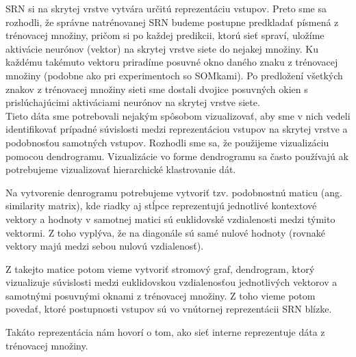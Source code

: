 SRN si na skrytej vrstve vytvára určitú reprezentáciu vstupov. Preto sme sa rozhodli, že 
správne natrénovanej SRN budeme postupne predkladať písmená z trénovacej množiny, pričom si po každej predikcii, ktorú sieť spraví,
 uložíme aktivácie neurónov (vektor) na skrytej vrstve siete do nejakej množiny. 
Ku každému takémuto vektoru priradíme posuvné okno daného znaku z trénovacej množiny (podobne ako pri experimentoch so SOMkami). 
Po predložení všetkých znakov z trénovacej množiny sieti sme dostali dvojice posuvných okien s prislúchajúcimi aktiváciami neurónov
na skrytej vrstve siete. \\

Tieto dáta sme potrebovali nejakým spôsobom vizualizovať, aby sme v nich vedeli identifikovať prípadné súvislosti medzi reprezentáciou vstupov na skrytej vrstve a 
podobnosťou samotných vstupov.
Rozhodli sme sa, že použijeme vizualizáciu pomocou dendrogramu.
Vizualizácie vo forme dendrogramu sa často používajú ak potrebujeme vizualizovať hierarchické klastrovanie dát.

Na vytvorenie denrogramu potrebujeme vytvoriť tzv. podobnostnú maticu (ang. similarity matrix), kde 
riadky aj stĺpce reprezentujú jednotlivé kontextové vektory a hodnoty v samotnej matici sú euklidovské vzdialenosti medzi týmito vektormi.
Z toho vyplýva, že na diagonále sú samé nulové hodnoty (rovnaké vektory majú medzi sebou nulovú vzdialenosť).

Z takejto matice potom vieme vytvoriť stromový graf, dendrogram, ktorý vizualizuje súvislosti medzi euklidovskou vzdialenosťou jednotlivých vektorov a samotnými posuvnými oknami z trénovacej množiny.
Z toho vieme potom povedať, ktoré postupnosti vstupov sú vo vnútornej reprezentácii SRN blízke. 

Takáto reprezentácia nám hovorí o tom, ako sieť interne reprezentuje dáta z trénovacej množiny.


